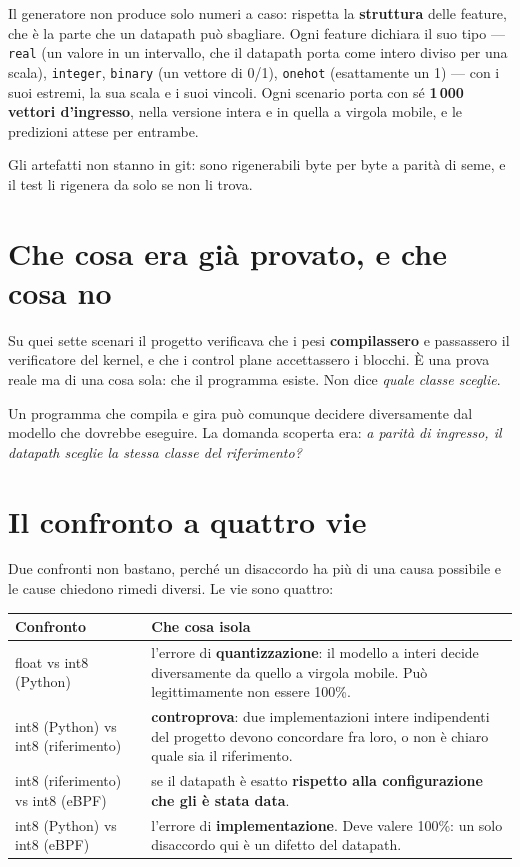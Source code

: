 \documentclass[11pt,a4paper,oneside]{report}
\begin{document}
Il generatore non produce solo numeri a caso: rispetta la \textbf{struttura}
delle feature, che è la parte che un datapath può sbagliare. Ogni feature
dichiara il suo tipo --- \texttt{real} (un valore in un intervallo, che il
datapath porta come intero diviso per una scala), \texttt{integer},
\texttt{binary} (un vettore di 0/1), \texttt{onehot} (esattamente un 1) --- con
i suoi estremi, la sua scala e i suoi vincoli. Ogni scenario porta con sé
\textbf{1\,000 vettori d'ingresso}, nella versione intera e in quella a virgola
mobile, e le predizioni attese per entrambe.

Gli artefatti non stanno in git: sono rigenerabili byte per byte a parità di
seme, e il test li rigenera da solo se non li trova.

\section{Che cosa era già provato, e che cosa no}

Su quei sette scenari il progetto verificava che i pesi \textbf{compilassero} e
passassero il verificatore del kernel, e che i control plane accettassero i
blocchi. È una prova reale ma di una cosa sola: che il programma esiste. Non
dice \emph{quale classe sceglie}.

\begin{prima}
Un programma che compila e gira può comunque decidere diversamente dal modello
che dovrebbe eseguire. La domanda scoperta era: \emph{a parità di ingresso, il
datapath sceglie la stessa classe del riferimento?}
\end{prima}

\section{Il confronto a quattro vie}

Due confronti non bastano, perché un disaccordo ha più di una causa possibile e
le cause chiedono rimedi diversi. Le vie sono quattro:

\begin{center}
\small
\begin{tabular}{@{}lp{8.4cm}@{}}
\toprule
\textbf{Confronto} & \textbf{Che cosa isola} \\
\midrule
float vs int8 (Python) &
  l'errore di \textbf{quantizzazione}: il modello a interi decide diversamente
  da quello a virgola mobile. Può legittimamente non essere 100\%. \\
int8 (Python) vs int8 (riferimento) &
  \textbf{controprova}: due implementazioni intere indipendenti del progetto
  devono concordare fra loro, o non è chiaro quale sia il riferimento. \\
int8 (riferimento) vs int8 (eBPF) &
  se il datapath è esatto \textbf{rispetto alla configurazione che gli è stata
  data}. \\
int8 (Python) vs int8 (eBPF) &
  l'errore di \textbf{implementazione}. Deve valere 100\%: un solo disaccordo
  qui è un difetto del datapath. \\
\bottomrule
\end{tabular}
\end{center}
\end{document}
